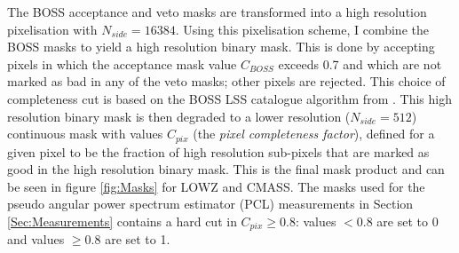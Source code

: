 \qquad The BOSS acceptance and veto masks are transformed into a high resolution \healpix pixelisation with $N_{side} = 16384$. Using this pixelisation scheme, I combine the BOSS masks to yield a high resolution binary mask. This is done by accepting pixels in which the acceptance mask value $C_{BOSS}$ exceeds 0.7 and which are not marked as bad in any of the veto masks; other pixels are rejected. This choice of completeness cut is based on the BOSS LSS catalogue algorithm from \cite{BOSSCatalogue2016}. This high resolution binary mask is then degraded to a lower resolution ($N_{side} = 512$) continuous mask with values $C_{pix}$ (the \textit{pixel completeness factor}), defined for a given pixel to be the fraction of high resolution sub-pixels that are marked as good in the high resolution binary mask. This is the final mask product and can be seen in figure \ref{fig:Masks} for LOWZ and CMASS. The masks used for the pseudo angular power spectrum estimator (PCL) measurements in Section \ref{Sec:Measurements} contains a hard cut in $C_{pix} \geq 0.8$: values $< 0.8$ are set to 0 and values $\geq 0.8$ are set to 1.

